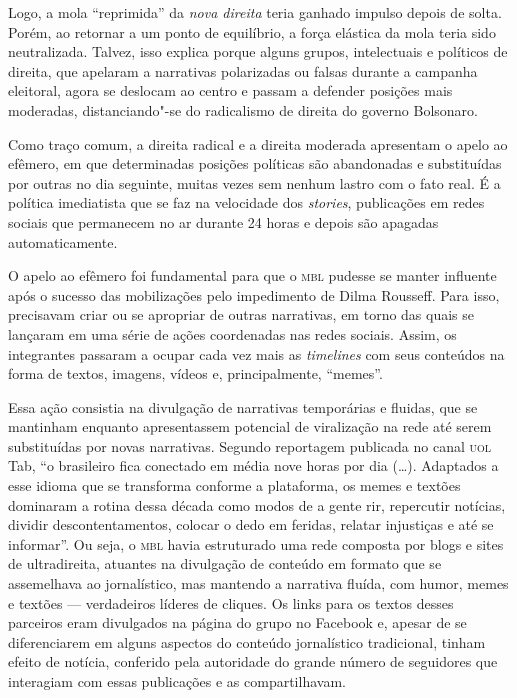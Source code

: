Logo, a mola ``reprimida'' da \textit{nova direita} teria ganhado impulso depois
de solta. Porém, ao retornar a um ponto de equilíbrio, a força elástica
da mola teria sido neutralizada. Talvez, isso explica porque alguns
grupos, intelectuais e políticos de direita, que apelaram a narrativas
polarizadas ou falsas durante a campanha eleitoral, agora se deslocam ao
centro e passam a defender posições mais moderadas, distanciando"-se do
radicalismo de direita do governo Bolsonaro.

Como traço comum, a direita radical e a direita moderada apresentam o
apelo ao efêmero, em que determinadas posições políticas são abandonadas
e substituídas por outras no dia seguinte, muitas vezes sem nenhum
lastro com o fato real. É a política imediatista que se faz na
velocidade dos \textit{stories}, publicações em redes sociais que
permanecem no ar durante 24 horas e depois são apagadas automaticamente.

O apelo ao efêmero foi fundamental para que o \textsc{mbl} pudesse se manter
influente após o sucesso das mobilizações pelo impedimento de Dilma
Rousseff. Para isso, precisavam criar ou se apropriar de outras
narrativas, em torno das quais se lançaram em uma série de ações
coordenadas nas redes sociais. Assim, os integrantes passaram a ocupar
cada vez mais as \textit{timelines} com seus conteúdos na forma de textos,
imagens, vídeos e, principalmente, ``memes''.


Essa ação consistia na divulgação de narrativas temporárias e fluidas,
que se mantinham enquanto apresentassem potencial de viralização na rede
até serem substituídas por novas narrativas. Segundo reportagem
publicada no canal \textsc{uol} Tab, ``o brasileiro fica conectado em média nove
horas por dia (\ldots{}). Adaptados a esse idioma que se transforma conforme
a plataforma, os memes e textões dominaram a rotina dessa década como
modos de a gente rir, repercutir notícias, dividir descontentamentos,
colocar o dedo em feridas, relatar injustiças e até se informar''. Ou
seja, o \textsc{mbl} havia estruturado uma rede composta por blogs e sites de
ultradireita, atuantes na divulgação de conteúdo em formato que se
assemelhava ao jornalístico, mas mantendo a narrativa fluída, com humor,
memes e textões --- verdadeiros líderes de cliques. Os links para os
textos desses parceiros eram divulgados na página do grupo no Facebook
e, apesar de se diferenciarem em alguns aspectos do conteúdo
jornalístico tradicional, tinham efeito de notícia, conferido pela
autoridade do grande número de seguidores que interagiam com essas
publicações e as compartilhavam.

